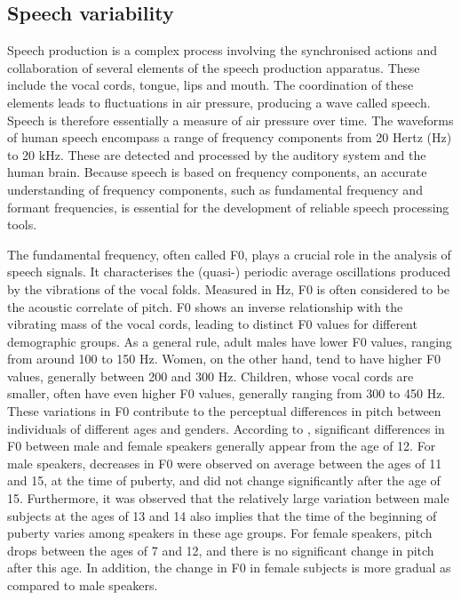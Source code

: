 \subsection{Speech variability}%
Speech production is a complex process involving the synchronised actions and collaboration of several elements of the speech production apparatus. These include the vocal cords, tongue, lips and mouth. The coordination of these elements leads to fluctuations in air pressure, producing a wave called speech. Speech is therefore essentially a measure of air pressure over time. The waveforms of human speech encompass a range of frequency components from 20 Hertz (Hz) to 20 kHz. These are detected and processed by the auditory system and the human brain. Because speech is based on frequency components, an accurate understanding of frequency components, such as fundamental frequency and formant frequencies, is essential for the development of reliable speech processing tools.

The fundamental frequency, often called F0, plays a crucial role in the analysis of speech signals. It characterises the (quasi-) periodic average oscillations produced by the vibrations of the vocal folds. Measured in Hz, F0 is often considered to be the acoustic correlate of pitch. F0 shows an inverse relationship with the vibrating mass of the vocal cords, leading to distinct F0 values for different demographic groups. As a general rule, adult males have lower F0 values, ranging from around 100 to 150 Hz. Women, on the other hand, tend to have higher F0 values, generally between 200 and 300 Hz. Children, whose vocal cords are smaller, often have even higher F0 values, generally ranging from 300 to 450 Hz. These variations in F0 contribute to the perceptual differences in pitch between individuals of different ages and genders. 
According to \cite{Acoustic_change_children}, significant differences in F0 between male and female speakers generally appear from the age of 12. For male speakers, decreases in F0 were observed on average between the ages of 11 and 15, at the time of puberty, and did not change significantly after the age of 15. Furthermore, it was observed that the relatively large variation between male subjects at the ages of 13 and 14 also implies that the time of the beginning of puberty varies among speakers in these age groups. For female speakers, pitch drops between the ages of 7 and 12, and there is no significant change in pitch after this age. In addition, the change in F0 in female subjects is more gradual as compared to male speakers.

